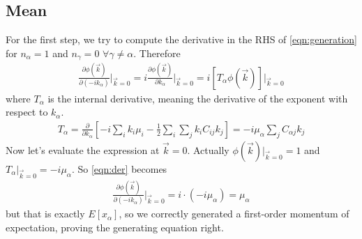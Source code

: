 \documentclass[a4paper,11pt,fleqn]{article}
\begin{document}
\subsection{Mean}
For the first step, we try to compute the derivative in the RHS of 
\ref{eqn:generation} for $n_{\alpha}=1$ and $n_{\gamma}=0$ 
$\forall \gamma \neq \alpha$. Therefore 
\begin{gather*}
    \label{eqn:der}
    \frac{\partial \phi(\vec{k})}{\partial(-ik_{\alpha})}\Big|_{\vec{k}=0} = i \frac{\partial \phi(\vec{k})}{\partial k_{\alpha}}\Big|_{\vec{k}=0} = i \left[T_{\alpha}\phi(\vec{k})\right]\Big|_{\vec{k}=0}
\end{gather*}
where $T_{\alpha}$ is the internal derivative, meaning the derivative of the 
exponent with respect to $k_{\alpha}$.
\begin{gather*}
    T_{\alpha} = \frac{\partial}{\partial k_{\alpha}}\left[-i\sum_i k_i \mu_i -\frac{1}{2}\sum_i \sum_j k_i C_{ij}k_j\right] = -i\mu_{\alpha} \sum_jC_{\alpha j}k_j
\end{gather*}
Now let's evaluate the expression at $\vec{k}=0$. Actually $\phi(\vec{k})|_{\vec{k}=0}=1$
and $T_{\alpha}|_{\vec{k}=0}=-i\mu_{\alpha}$. So \ref{eqn:der} becomes
\begin{gather*}
    \frac{\partial \phi(\vec{k})}{\partial(-ik_{\alpha})}\Big|_{\vec{k}=0} = i \cdot (-i\mu_{\alpha}) = \mu_{\alpha}
\end{gather*}
but that is exactly $E[x_{\alpha}]$, so we correctly generated a first-order 
momentum of expectation, proving the generating equation right.
\end{document}
